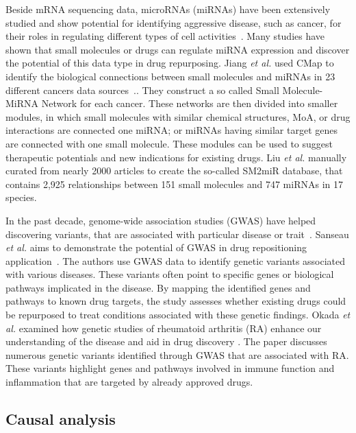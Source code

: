 Beside mRNA sequencing data, microRNAs (miRNAs) have been extensively studied and show potential for identifying aggressive disease, such as cancer, for their roles in regulating different types of cell activities~\cite{ding2014micrornas, wen2014micrornas}. Many studies have shown that small molecules or drugs can regulate miRNA expression and discover the potential of this data type in drug repurposing.
Jiang \textit{et al.} used CMap to identify the biological connections between small
molecules and miRNAs in 23 different cancers data sources~\cite{jiang2012identification}.. They construct a so called Small Molecule-MiRNA Network for each cancer. These networks are then divided into smaller modules, in which small molecules with similar chemical structures, MoA, or drug interactions are connected one miRNA; or miRNAs having similar target genes are connected with one small molecule. These modules can be used to suggest therapeutic potentials and new indications for existing drugs.
Liu \textit{et al.} \cite{liu2013sm2mir} manually curated from nearly 2000 articles to create the so-called SM2miR database, that contains 2,925 relationships between 151 small molecules and 747 miRNAs in 17 species.

In the past decade, genome-wide association studies (GWAS) have helped discovering variants, that are associated with particular disease or trait~\cite{visscher2012five, hebbring2014challenges}. Sanseau \textit{et al.} aims to demonstrate the potential of GWAS in drug repositioning application~\cite{sanseau2012use}. The authors use GWAS data to identify genetic variants associated with various diseases. These variants often point to specific genes or biological pathways implicated in the disease. By mapping the identified genes and pathways to known drug targets, the study assesses whether existing drugs could be repurposed to treat conditions associated with these genetic findings. Okada \textit{et al.} examined how genetic studies of rheumatoid arthritis (RA) enhance our understanding of the disease and aid in drug discovery \cite{okada2014genetics}. The paper discusses numerous genetic variants identified through GWAS that are associated with RA. These variants highlight genes and pathways involved in immune function and inflammation that are targeted by already approved drugs.


\subsection{Causal analysis}

